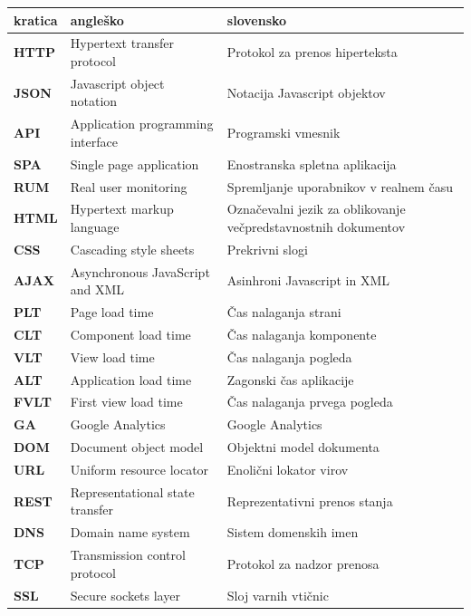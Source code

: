 \documentclass[a4paper, 12pt]{book}
\begin{document}
\noindent\begin{tabular}{p{}|p{}|p{}}    %
  {\bf kratica} & {\bf angleško}  & {\bf slovensko} \\ \hline
  {\bf HTTP}      & Hypertext transfer protocol  & Protokol za prenos hiperteksta \\
  {\bf JSON} & Javascript object notation & Notacija Javascript objektov \\
  {\bf API}   & Application programming interface   & Programski vmesnik \\
  {\bf SPA}   & Single page application   & Enostranska spletna aplikacija \\
  {\bf RUM}   & Real user monitoring  & Spremljanje uporabnikov v realnem času \\
  {\bf HTML}   & Hypertext markup language  & Označevalni jezik za oblikovanje večpredstavnostnih dokumentov \\
  {\bf CSS}   & Cascading style sheets  & Prekrivni slogi \\
  {\bf AJAX}   & Asynchronous JavaScript and XML  & Asinhroni Javascript in XML \\
  {\bf PLT}   & Page load time  & Čas nalaganja strani \\
  {\bf CLT}   & Component load time  & Čas nalaganja komponente \\
  {\bf VLT}   & View load time  & Čas nalaganja pogleda \\
  {\bf ALT}   & Application load time & Zagonski čas aplikacije \\
  {\bf FVLT}   & First view load time  & Čas nalaganja prvega pogleda \\
  {\bf GA}   & Google Analytics  & Google Analytics \\
  {\bf DOM}   & Document object model  & Objektni model dokumenta \\
  {\bf URL}   & Uniform resource locator  & Enolični lokator virov \\
  {\bf REST}   & Representational state transfer  & Reprezentativni prenos stanja \\
  {\bf DNS}   & Domain name system    & Sistem domenskih imen \\
  {\bf TCP}   & Transmission control protocol  & Protokol za nadzor prenosa \\
  {\bf SSL}   & Secure sockets layer  & Sloj varnih vtičnic \\
                          
\end{tabular}
\end{document}
